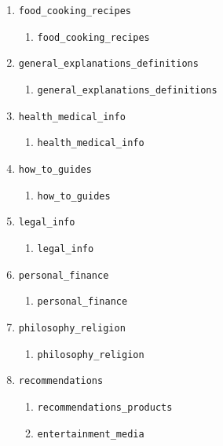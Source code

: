 \documentclass{article}
\begin{document}
\begin{enumerate}
    \item \texttt{food\_cooking\_recipes}
    \begin{enumerate}
        \item \texttt{food\_cooking\_recipes}
    \end{enumerate}

    \item \texttt{general\_explanations\_definitions}
    \begin{enumerate}
        \item \texttt{general\_explanations\_definitions}
    \end{enumerate}

    \item \texttt{health\_medical\_info}
    \begin{enumerate}
        \item \texttt{health\_medical\_info}
    \end{enumerate}

    \item \texttt{how\_to\_guides}
    \begin{enumerate}
        \item \texttt{how\_to\_guides}
    \end{enumerate}

    \item \texttt{legal\_info}
    \begin{enumerate}
        \item \texttt{legal\_info}
    \end{enumerate}

    \item \texttt{personal\_finance}
    \begin{enumerate}
        \item \texttt{personal\_finance}
    \end{enumerate}

    \item \texttt{philosophy\_religion}
    \begin{enumerate}
        \item \texttt{philosophy\_religion}
    \end{enumerate}

    \item \texttt{recommendations}
    \begin{enumerate}
        \item \texttt{recommendations\_products}
        \item \texttt{entertainment\_media}
    \end{enumerate}


\end{enumerate}
\end{document}
